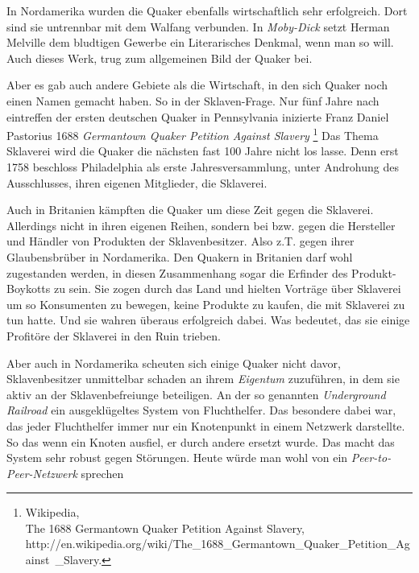 \medskip

In Nordamerika wurden die Quaker ebenfalls wirtschaftlich sehr erfolgreich. Dort
sind sie untrennbar mit dem Walfang verbunden. In \textit{Moby-Dick} setzt
Herman Melville dem bludtigen Gewerbe ein Literarisches Denkmal, wenn man so
will. Auch dieses Werk, trug zum allgemeinen Bild der Quaker bei.

\medskip

Aber es gab auch andere Gebiete als die Wirtschaft, in den sich Quaker noch
einen
Namen gemacht haben. So in der Sklaven-Frage. Nur fünf Jahre nach eintreffen
der ersten deutschen Quaker in Pennsylvania inizierte Franz Daniel Pastorius
1688 \textit{Germantown Quaker Petition Against Slavery}
\footnote{Wikipedia,
\\The 1688 Germantown Quaker Petition Against Slavery,
\\http://en.wikipedia.org/wiki/The\_1688\_Germantown\_Quaker\_Petition\_Against\
\_Slavery.} Das Thema Sklaverei wird die Quaker die nächsten fast 100 Jahre
nicht
los lasse. Denn erst 1758 beschloss Philadelphia als erste Jahresversammlung,
unter Androhung des Ausschlusses, ihren eigenen Mitglieder, die Sklaverei.

\medskip

Auch in Britanien kämpften die Quaker um diese Zeit gegen die Sklaverei.
Allerdings nicht in ihren eigenen Reihen, sondern bei bzw. gegen die Hersteller
und Händler von Produkten der Sklavenbesitzer. Also z.T. gegen ihrer
Glaubensbrüber in Nordamerika. Den Quakern in Britanien darf wohl zugestanden
werden, in diesen Zusammenhang sogar die Erfinder des Produkt-Boykotts zu sein.
Sie zogen durch das Land und hielten Vorträge über Sklaverei um so Konsumenten
zu
bewegen, keine Produkte zu kaufen, die mit Sklaverei zu tun hatte. Und sie
wahren überaus erfolgreich dabei. Was bedeutet, das sie einige Profitöre der
Sklaverei in den Ruin trieben.

\medskip

Aber auch in Nordamerika scheuten sich einige Quaker nicht davor,
Sklavenbesitzer unmittelbar schaden an ihrem \textit{Eigentum} zuzuführen, in
dem sie aktiv an der Sklavenbefreiunge beteiligen. An der so genannten
\textit{Underground Railroad} ein ausgeklügeltes System von Fluchthelfer. Das
besondere dabei war, das jeder Fluchthelfer immer nur ein Knotenpunkt in einem
Netzwerk darstellte. So das wenn ein Knoten ausfiel, er durch andere ersetzt
wurde. Das macht das System sehr robust gegen Störungen. Heute würde man wohl
von ein \textit{Peer-to-Peer-Netzwerk} sprechen

